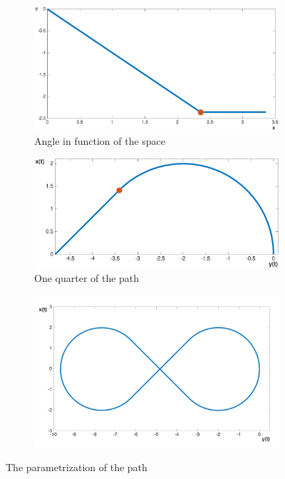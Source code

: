 \begin{figure}[!htbp]
 \centering
   \begin{subfigure}[b]{0.42\textwidth}
     \includegraphics[width=\textwidth]{img/angle_x.eps}
        \caption{Angle in function of the space}
        \label{fig:quarter_theta}
   \end{subfigure}
   \hfill
   \begin{subfigure}[b]{0.45\textwidth}
     \includegraphics[width=\textwidth]{img/path_x_quarter.eps}
        \caption{One quarter of the path}
       \label{fig:quarter_xy}
   \end{subfigure}
   
   \begin{subfigure}[b]{0.45\textwidth}
     \includegraphics[width=\textwidth]{img/infinityshapepath.png}
       \label{fig:entire_xy}
   \end{subfigure}
    \caption{The parametrization of the path}
  \label{fig:path}
  \end{figure}
  

